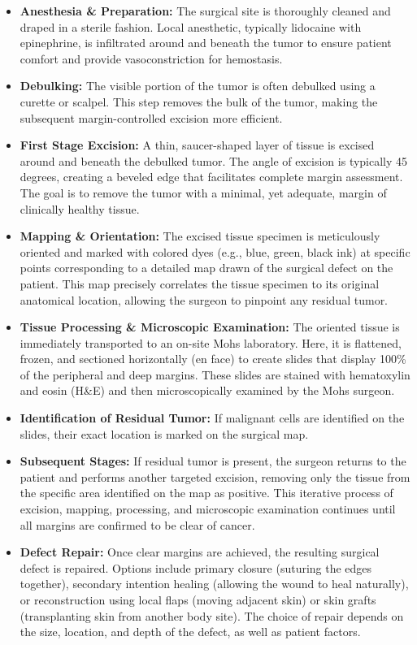 \begin{itemize}
  \item \textbf{Anesthesia \& Preparation:} The surgical site is thoroughly cleaned and draped in a sterile fashion. Local anesthetic, typically lidocaine with epinephrine, is infiltrated around and beneath the tumor to ensure patient comfort and provide vasoconstriction for hemostasis.
  
  \item \textbf{Debulking:} The visible portion of the tumor is often debulked using a curette or scalpel. This step removes the bulk of the tumor, making the subsequent margin-controlled excision more efficient.
  
  \item \textbf{First Stage Excision:} A thin, saucer-shaped layer of tissue is excised around and beneath the debulked tumor. The angle of excision is typically 45 degrees, creating a beveled edge that facilitates complete margin assessment. The goal is to remove the tumor with a minimal, yet adequate, margin of clinically healthy tissue.
  
  \item \textbf{Mapping \& Orientation:} The excised tissue specimen is meticulously oriented and marked with colored dyes (e.g., blue, green, black ink) at specific points corresponding to a detailed map drawn of the surgical defect on the patient. This map precisely correlates the tissue specimen to its original anatomical location, allowing the surgeon to pinpoint any residual tumor.
  
  \item \textbf{Tissue Processing \& Microscopic Examination:} The oriented tissue is immediately transported to an on-site Mohs laboratory. Here, it is flattened, frozen, and sectioned horizontally (en face) to create slides that display 100\% of the peripheral and deep margins. These slides are stained with hematoxylin and eosin (H\&E) and then microscopically examined by the Mohs surgeon.
  
  \item \textbf{Identification of Residual Tumor:} If malignant cells are identified on the slides, their exact location is marked on the surgical map.
  
  \item \textbf{Subsequent Stages:} If residual tumor is present, the surgeon returns to the patient and performs another targeted excision, removing only the tissue from the specific area identified on the map as positive. This iterative process of excision, mapping, processing, and microscopic examination continues until all margins are confirmed to be clear of cancer.
  
  \item \textbf{Defect Repair:} Once clear margins are achieved, the resulting surgical defect is repaired. Options include primary closure (suturing the edges together), secondary intention healing (allowing the wound to heal naturally), or reconstruction using local flaps (moving adjacent skin) or skin grafts (transplanting skin from another body site). The choice of repair depends on the size, location, and depth of the defect, as well as patient factors.
\end{itemize}

